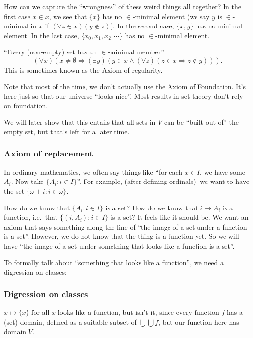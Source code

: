 \documentclass[a4paper]{article}
\begin{document}
How can we capture the ``wrongness'' of these weird things all together? In the first case $x\in x$, we see that $\{x\}$ has no $\in$-minimal element (we say $y$ is $\in$-minimal in $x$ if $(\forall z\in x)(y\not\in z)$). In the second case, $\{x, y\}$ has no minimal element. In the last case, $\{x_0, x_1, x_2, \cdots\}$ has no $\in$-minimal element.


\begin{axiom}
  ``Every (non-empty) set has an $\in$-minimal member''
  \[
    (\forall x)(x\not= \emptyset \Rightarrow (\exists y)(y\in x\wedge (\forall z)(z\in x \Rightarrow z\not\in y))).
  \]
  This is sometimes known as the Axiom of regularity.
\end{axiom}
Note that most of the time, we don't actually use the Axiom of Foundation. It's here just so that our universe ``looks nice''. Most results in set theory don't rely on foundation.

We will later show that this entails that all sets in $V$ can be ``built out of'' the empty set, but that's left for a later time.

\subsubsection*{Axiom of replacement}
In ordinary mathematics, we often say things like ``for each $x\in I$, we have some $A_i$. Now take $\{A_i: i\in I\}$''. For example, (after defining ordinals), we want to have the set $\{\omega + i: i\in \omega\}$.

How do we know that $\{A_i: i\in I\}$ is a set? How do we know that $i\mapsto A_i$ is a function, i.e.\ that $\{(i, A_i): i\in I\}$ is a set? It feels like it should be. We want an axiom that says something along the line of ``the image of a set under a function is a set''. However, we do not know that the thing is a function yet. So we will have ``the image of a set under something that looks like a function is a set''.

To formally talk about ``something that looks like a function'', we need a digression on classes:

\subsubsection*{Digression on classes}
$x\mapsto \{x\}$ for all $x$ looks like a function, but isn't it, since every function $f$ has a (set) domain, defined as a suitable subset of $\bigcup \bigcup f$, but our function here has domain $V$.
\end{document}

